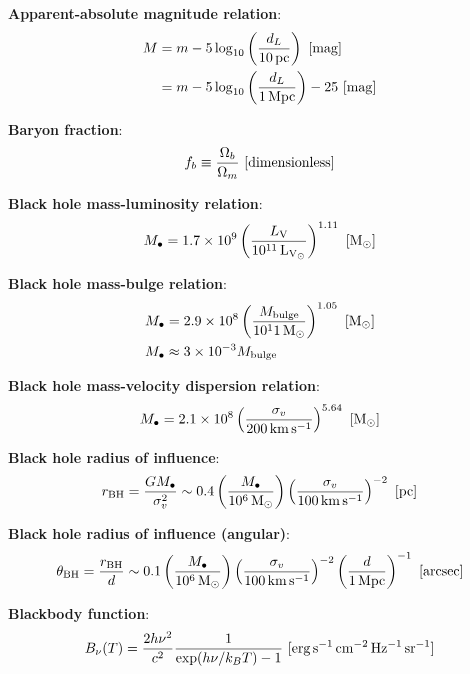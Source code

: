 \documentclass[a4paper,11pt]{article}
\begin{document}
{\noindent}\textbf{Apparent-absolute magnitude relation}:
\begin{align*}
    M &= m -5\log_{10}\left(\frac{d_L}{10\,{\rm pc}}\right) ~ [{\rm mag}] \\
      &= m -5\log_{10}\left(\frac{d_L}{1\,{\rm Mpc}}\right)-25 ~ [{\rm mag}]
\end{align*}

{\noindent}\textbf{Baryon fraction}:
\begin{align*}
    f_b \equiv \frac{\Omega_b}{\Omega_m} ~ [{\rm dimensionless}]
\end{align*}

{\noindent}\textbf{Black hole mass-luminosity relation}:
\begin{align*}
    M_\bullet = 1.7\times10^9\left(\frac{L_\mathrm{V}}{10^{11}\,{\rm L_{V_\odot}}}\right)^{1.11} ~ [{\rm M_\odot}]
\end{align*}

{\noindent}\textbf{Black hole mass-bulge relation}:
\begin{align*}
    M_\bullet &= 2.9\times10^8\left(\frac{M_\mathrm{bulge}}{10^11\,{\rm M_\odot}}\right)^{1.05} ~ [{\rm M_\odot}] \\
    M_\bullet &\approx 3\times10^{-3}M_\mathrm{bulge}
\end{align*}

{\noindent}\textbf{Black hole mass-velocity dispersion relation}:
\begin{align*}
    M_\bullet = 2.1\times 10^8\left(\frac{\sigma_v}{200\,{\rm km\,s^{-1}}}\right)^{5.64} ~ [{\rm M_\odot}]
\end{align*}

{\noindent}\textbf{Black hole radius of influence}:
\begin{align*}
    r_\mathrm{BH} = \frac{GM_\bullet}{\sigma_v^2} \sim 0.4\left(\frac{M_\bullet}{10^6\,{\rm M_\odot}}\right)\left(\frac{\sigma_v}{100\,{\rm km\,s^{-1}}}\right)^{-2} ~ [{\rm pc}]
\end{align*}

{\noindent}\textbf{Black hole radius of influence (angular)}:
\begin{align*}
    \theta_\mathrm{BH} = \frac{r_\mathrm{BH}}{d} \sim 0.1\left(\frac{M_\bullet}{10^6\,{\rm M_\odot}}\right) \left(\frac{\sigma_v}{100\,{\rm km\,s^{-1}}}\right)^{-2} \left(\frac{d}{1\,{\rm Mpc}}\right)^{-1} ~ [{\rm arcsec}]
\end{align*}

{\noindent}\textbf{Blackbody function}:
\begin{align*}
    B_\nu(T) = \frac{2h\nu^2}{c^2} \frac{1}{\exp(h\nu/k_BT) - 1} ~ [{\rm erg\,s^{-1}\,cm^{-2}\,Hz^{-1}\,sr^{-1}}]
\end{align*}
\end{document}
